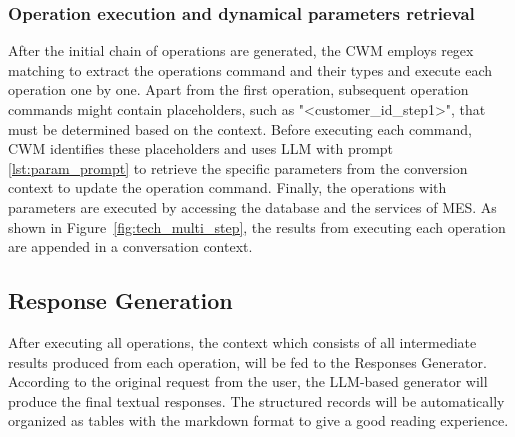 \documentclass[preprint,12pt]{elsarticle}
\begin{document}
\subsubsection{Operation execution and dynamical parameters retrieval}
After the initial chain of operations are generated, the CWM employs regex matching to extract the operations command and their types and execute each operation one by one. 
Apart from the first operation, subsequent operation commands might contain placeholders, such as "<customer\_id\_step1>", that must be determined based on the context.
Before executing each command, CWM identifies these placeholders and uses LLM with prompt \ref{lst:param_prompt} to retrieve the specific parameters from the conversion context to update the operation command.
Finally, the operations with parameters are executed by accessing the database and the services of MES.
As shown in Figure~\ref{fig:tech_multi_step}, the results from executing each operation are appended in a conversation context.

\subsection{Response Generation}
After executing all operations, the context which consists of all intermediate results produced from each operation, will be fed to the Responses Generator. 
According to the original request from the user, the LLM-based generator will produce the final textual responses.
The structured records will be automatically organized as tables with the markdown format to give a good reading experience.



\end{document}
